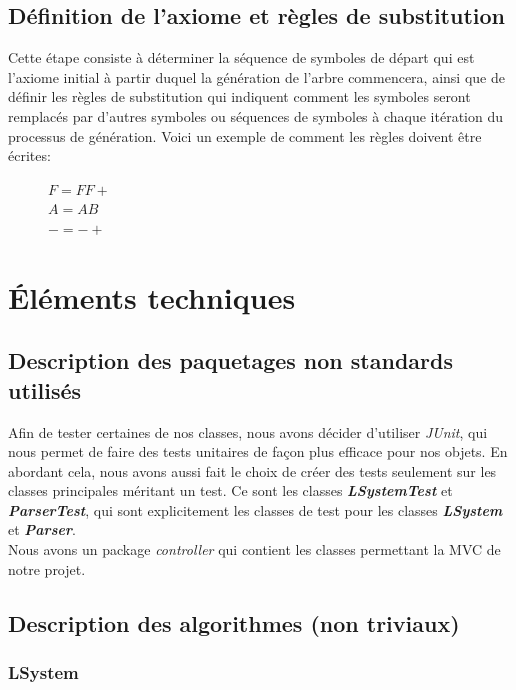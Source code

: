 \documentclass[12pt]{article}
\begin{document}
\subsection{Définition de l'axiome et règles de substitution}
Cette étape consiste à déterminer la séquence de symboles de départ qui est l'axiome initial à partir duquel la génération de l'arbre commencera, ainsi que de définir les règles de substitution qui indiquent comment les symboles seront remplacés par d'autres symboles ou séquences de symboles à chaque itération du processus de génération.
Voici un exemple de comment les règles doivent être écrites:
\begin{figure}[h]

$F=FF+$\\
$A=AB$\\
$-=-+$
\end{figure}




\section{Éléments techniques}
\subsection{Description des paquetages non standards utilisés}
Afin de tester certaines de nos classes, nous avons décider d'utiliser \textit{JUnit}, qui nous permet de faire des tests unitaires de façon plus efficace pour nos objets. En abordant cela, nous avons aussi fait le choix de créer des tests seulement sur les classes principales méritant un test. Ce sont les classes \textit{\textbf{LSystemTest}} et \textit{\textbf{ParserTest}}, qui sont explicitement les classes de test pour les classes \textit{\textbf{LSystem}} et \textit{\textbf{Parser}}.\\
Nous avons un package \textit{controller} qui contient les classes permettant la MVC de notre projet.

\subsection{Description des algorithmes (non triviaux)}
\subsubsection{LSystem}
\end{document}
